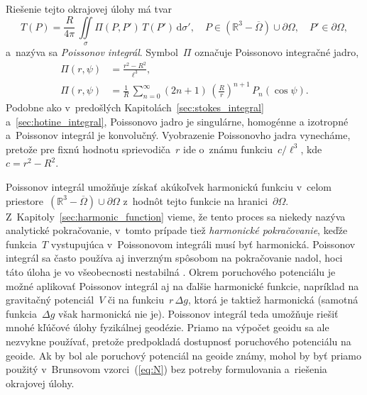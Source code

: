 \documentclass[a4paper, 12pt]{book}
\newcommand{\diff}{\mathrm d}
\begin{document}
Riešenie tejto okrajovej úlohy \parencite[pre odvodenie pozri 
napríklad][]{MoritzPhysicalGeodesy,SansoGeoidDetermination} má tvar
%
\begin{equation}
\label{eq:poisson}
T(P) = \frac{R}{4\pi} \, \iint\limits_\sigma \Pi(P, P') \, T(P') \, 
\diff\sigma'{,} \quad P \in \left( \mathbb{R}^3 - \overline\Omega \right) \cup 
\partial\Omega{,} \quad P' \in \partial\Omega{,}
\end{equation}
%
a~nazýva sa \emph{Poissonov integrál}.  Symbol~$\Pi$ označuje Poissonovo 
integračné jadro,
%
\begin{align}
\Pi(r, \psi) &= \frac{r^2 - R^2}{\ell^3}{,}\label{eq:poisson_kernel}\\
\Pi(r, \psi) &= \frac{1}{R} \, \sum_{n = 0}^{\infty} (2n + 1) \, \left( 
\frac{R}{r} \right)^{n + 1} \, 
P_n(\cos\psi)\label{eq:poisson_kernel_spectral}{.}
\end{align}
%
Podobne ako v~predošlých Kapitolách~\ref{sec:stokes_integral} 
a~\ref{sec:hotine_integral}, Poissonovo jadro je singulárne, homogénne 
a izotropné a~Poissonov integrál je konvolučný.  Vyobrazenie Poissonovho jadra 
vynecháme, pretože pre fixnú hodnotu sprievodiča~$r$ ide o~známu funkciu~$c 
\slash \ell^3$, kde $c = r^2 - R^2$.

Poissonov integrál umožňuje získať akúkoľvek harmonickú funkciu v~celom 
priestore~$\left( \mathbb{R}^3 - \overline\Omega \right) \cup \partial\Omega$ 
z~hodnôt tejto funkcie na hranici~$\partial\Omega$.  
Z~Kapitoly~\ref{sec:harmonic_function} vieme, že tento proces sa niekedy nazýva 
analytické pokračovanie, v~tomto prípade tiež \emph{harmonické pokračovanie}, 
keďže funkcia~$T$ vystupujúca v~Poissonovom integráli musí byť harmonická.  
Poissonov integrál sa často používa aj inverzným spôsobom na pokračovanie 
nadol, hoci táto úloha je vo všeobecnosti nestabilná 
\parencite{SansoGeodeticBoundaryValueProblem}.  Okrem poruchového potenciálu je 
možné aplikovať Poissonov integrál aj na ďalšie harmonické funkcie, napríklad 
na gravitačný potenciál~$V$ či na funkciu~$r \, \Delta g$, ktorá je taktiež 
harmonická (samotná funkcia~$\Delta g$ však harmonická nie je).  Poissonov 
integrál teda umožňuje riešiť mnohé kľúčové úlohy fyzikálnej geodézie.  Priamo 
na výpočet geoidu sa ale nezvykne používať, pretože predpokladá dostupnosť 
poruchového potenciálu na geoide.  Ak by bol ale poruchový potenciál na geoide 
známy, mohol by byť priamo použitý v~Brunsovom vzorci~(\ref{eq:N}) bez potreby 
formulovania a~riešenia okrajovej úlohy.
\end{document}
